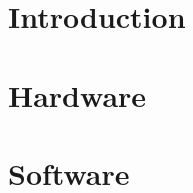 \documentclass[12pt,oneside,letterpaper,english]{article}
\begin{document}


\newpage
\doublespacing
{} %
\renewcommand{\baselinestretch}{1}\normalsize
\tableofcontents
\renewcommand{\baselinestretch}{1}\normalsize
\thispagestyle{fancy} %

% 

\newpage
{} 

\newpage
\section{Introduction} \label{ch1}
 

\newpage
\section{Hardware} \label{ch2}


\section{Software} \label{ch3}


\label{EndOfText}



\label{endOfDoc}
\end{document}
